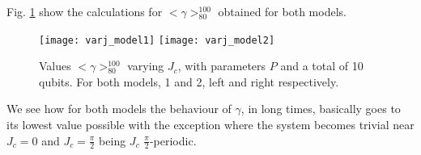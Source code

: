 \documentclass[twocolumn,floatfix]{article}
\begin{document}
Fig. \ref{varj} show the calculations for $<\gamma>_{80}^{100}$ obtained for both models.
\begin{figure}[H]
\begin{center}
\texttt{[image: varj\_model1]} \hfill
\texttt{[image: varj\_model2]} 
\end{center}
\caption{Values $<\gamma>_{80}^{100}$ varying $J_c$, with parameters $P$ and 
a total of 10 qubits. For both models, 1 and 2, left and right respectively.}
\label{varj}
\end{figure}

We see how for both models the behaviour of $\gamma$, in long times, basically goes to its lowest
value possible with the exception where the system becomes trivial near $J_c=0$ and $J_c=\frac{\pi}{2}$ being 
$J_c$ $\frac{\pi}{2}$-periodic.
\end{document}
